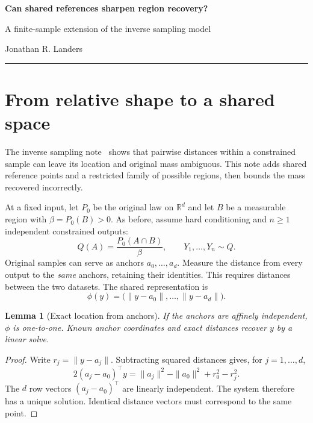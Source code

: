 \documentclass[10pt,letterpaper]{article}
\theoremstyle{typed}
\newtheorem{lemma}{Lemma}
\begin{document}
\thispagestyle{fancy}

{\Large\bfseries Can shared references sharpen region recovery?}\par
{\small A finite-sample extension of the inverse sampling model}\par
{\small Jonathan R. Landers}\par
\vspace{0.25em}\noindent\rule{\textwidth}{0.5pt}

\section{From relative shape to a shared space}

The inverse sampling note~\cite{inverse} shows that pairwise distances
within a constrained sample can leave its location and original mass
ambiguous. This note adds shared reference points and a restricted family
of possible regions, then bounds the mass recovered incorrectly.

At a fixed input, let $P_0$ be the original law on $\mathbb R^d$ and let
$B$ be a measurable region with $\beta=P_0(B)>0$. As before, assume hard
conditioning and $n\geq1$ independent constrained outputs:
\begin{equation}
  Q(A)=\frac{P_0(A\cap B)}{\beta},\qquad Y_1,\ldots,Y_n\sim Q.
  \label{eq:model}
\end{equation}
Original samples can serve as anchors $a_0,\ldots,a_d$. Measure the
distance from every output to the \emph{same} anchors, retaining their
identities. This requires distances between the two datasets. The
shared representation is
\begin{equation}
  \phi(y)=\bigl(\|y-a_0\|,\ldots,\|y-a_d\|\bigr).
  \label{eq:anchors}
\end{equation}

\begin{lemma}[Exact location from anchors]
If the anchors are affinely independent, $\phi$ is one-to-one.
Known anchor coordinates and exact distances recover $y$ by a linear solve.
\end{lemma}
\begin{proof}
Write $r_j=\|y-a_j\|$. Subtracting squared distances gives, for $j=1,\ldots,d$,
\[
  2(a_j-a_0)^\top y
  =\|a_j\|^2-\|a_0\|^2+r_0^2-r_j^2.
\]
The $d$ row vectors $(a_j-a_0)^\top$ are linearly independent.
The system therefore has a unique solution. Identical distance vectors
must correspond to the same point.
\end{proof}
\end{document}
